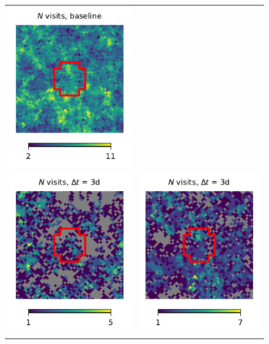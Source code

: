 \documentclass[preprintm,linenumbers]{aastex631}
\begin{document}
\begin{figure}
\begin{tabular}{@{}c@{}c@{}}
				\includegraphics{results/skymaps_cutout/skymaps_cutout_first_year_one_snap_v4_0_10yrs_db_noDD_noTwi_nside-256_CountMetric_g_WFD_noDD_noTwi.pdf} \\
				\includegraphics{results/skymaps_cutout/skymaps_cutout_first_year_one_snap_v4_0_10yrs_db_noDD_noTwi_tscale-3_nside-256_doAllTemplateMetrics_reduceCount_g_NES_noDD_noTwi.pdf} &
				\includegraphics{results/skymaps_cutout/skymaps_cutout_first_year_one_snap_v4_0_10yrs_db_noDD_noTwi_tscale-3_nside-256_doAllTemplateMetrics_reduceCount_g_WFD_noDD_noTwi.pdf} \\

\end{tabular}
\end{figure}
\end{document}
